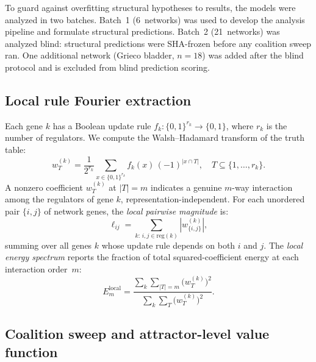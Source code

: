 \documentclass[10pt]{article}
\begin{document}
To guard against overfitting structural hypotheses to results, the
models were analyzed in two batches. Batch~1 (6~networks) was used to
develop the analysis pipeline and formulate structural predictions.
Batch~2 (21~networks) was analyzed blind: structural predictions were
SHA-frozen before any coalition sweep ran. One additional network (Grieco bladder,
$n = 18$) was added after the blind protocol and is excluded from
blind prediction scoring.


\subsection{Local rule Fourier extraction}
\label{sec:local-fourier}

Each gene $k$ has a Boolean update rule $f_k\colon \{0,1\}^{r_k}
\to \{0,1\}$, where $r_k$ is the number of regulators. We compute
the Walsh--Hadamard transform of the truth table:
%
\begin{equation}
\label{eq:local-wht}
w_T^{(k)} = \frac{1}{2^{r_k}} \sum_{x \in \{0,1\}^{r_k}} f_k(x)\,(-1)^{|x \cap T|},
\quad T \subseteq \{1, \ldots, r_k\}.
\end{equation}
%
A nonzero coefficient $w_T^{(k)}$ at $|T| = m$ indicates a genuine
$m$-way interaction among the regulators of gene $k$,
representation-independent. For each unordered pair $\{i,j\}$ of
network genes, the \emph{local pairwise magnitude} is:
%
\begin{equation}
\label{eq:local-pair}
\ell_{ij} = \sum_{k:\, i,j \in \mathrm{reg}(k)} |w_{\{i,j\}}^{(k)}|,
\end{equation}
%
summing over all genes $k$ whose update rule depends on both $i$ and
$j$. The \emph{local energy spectrum} reports the fraction of total
squared-coefficient energy at each interaction order~$m$:
%
\begin{equation}
\label{eq:local-spectrum}
E_m^{\mathrm{local}} = \frac{\sum_k \sum_{|T|=m} \bigl(w_T^{(k)}\bigr)^2}
{\sum_k \sum_T \bigl(w_T^{(k)}\bigr)^2}.
\end{equation}


\subsection{Coalition sweep and attractor-level value function}
\label{sec:coalition-sweep}
\end{document}
